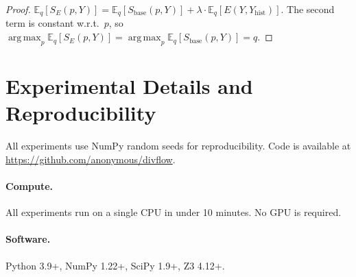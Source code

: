 \documentclass[10pt]{article}
\DeclareMathOperator*{\argmax}{arg\,max}
\begin{document}
\begin{proof}
$\mathbb{E}_q[S_E(p, Y)] = \mathbb{E}_q[S_{\text{base}}(p, Y)] + \lambda \cdot \mathbb{E}_q[E(Y, Y_{\text{hist}})]$.
The second term is constant w.r.t.\ $p$, so $\argmax_p \mathbb{E}_q[S_E(p, Y)] = \argmax_p \mathbb{E}_q[S_{\text{base}}(p, Y)] = q$.
\end{proof}

\section{Experimental Details and Reproducibility}
\label{app:reproduce}

All experiments use NumPy random seeds for reproducibility.
Code is available at \url{https://github.com/anonymous/divflow}.

\paragraph{Compute.} All experiments run on a single CPU in under 10 minutes.
No GPU is required.

\paragraph{Software.} Python 3.9+, NumPy 1.22+, SciPy 1.9+, Z3 4.12+.
\end{document}
